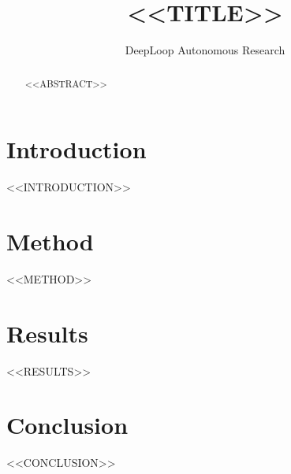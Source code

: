 \documentclass{article}
\title{<<TITLE>>}
\author{DeepLoop Autonomous Research}
\begin{document}
\maketitle
\begin{abstract}<<ABSTRACT>>\end{abstract}
\section{Introduction}<<INTRODUCTION>>
\section{Method}<<METHOD>>
\section{Results}<<RESULTS>>
\section{Conclusion}<<CONCLUSION>>
\end{document}
